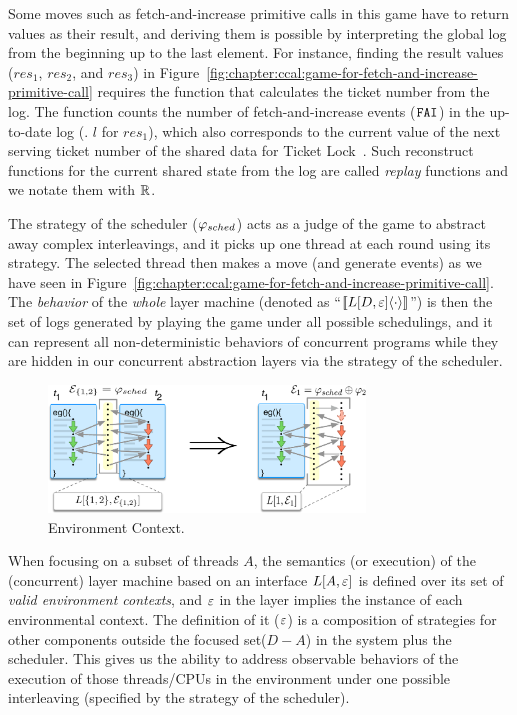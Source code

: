 Some moves such as fetch-and-increase primitive calls in this game have to return values as their result,
and deriving them is possible by interpreting the global log from the beginning up to the last element. 
For instance, finding the result values ($res_1$, $res_2$, and $res_3$) in Figure~\ref{fig:chapter:ccal:game-for-fetch-and-increase-primitive-call}
requires the function that calculates the ticket number from the log.
The function counts the number of fetch-and-increase events (${\mathrm{\texttt{FAI}}}$) in the up-to-date log (\eg. $l$ for $res_1$), which
also corresponds to the current value of the next serving ticket number of the shared data for Ticket Lock~\cite{lwn:ticketlocks}.
Such reconstruct functions for the current shared state from the log are called \emph{replay} functions and we notate them with $\mathbb{R}$.

The strategy of the scheduler ($\varphi_{sched}$) acts as a judge of the game to abstract away complex interleavings, 
and it picks up one thread at each round using its strategy. 
The selected thread then makes a move  (and generate events)  as we have seen in Figure~\ref{fig:chapter:ccal:game-for-fetch-and-increase-primitive-call}.
The \emph{behavior} of the \emph{whole} layer machine (denoted as ``$[\![{L[D, {\varepsilon}]} \langle {\cdot} \rangle]\!]$'') 
is then the set of  logs generated by playing the game under all possible schedulings, and it can represent all non-deterministic behaviors of concurrent programs 
while they are hidden in our concurrent abstraction layers via the strategy of the scheduler.

\begin{figure}[t]
\centering
\includegraphics[width=0.75\textwidth]{figs/ccal/pcomp}
\caption{Environment Context.}
\label{fig:chapter:ccal:env-contexs}
\end{figure}

When focusing on a subset of threads $A$, the semantics (or execution) of the (concurrent) layer machine based on an
interface $L[A, {\varepsilon}]$ is defined over its set of \emph{valid environment
contexts}, and ${\varepsilon}$ in the layer implies the instance of each environmental context.
The definition of it (${\varepsilon}$) is
a composition  of strategies for other components outside  the focused set($D - A$) in the 
system plus the scheduler.
This gives us the ability to address observable behaviors of the
execution of those threads/CPUs in the environment under one possible
interleaving (specified by the strategy of the scheduler).


